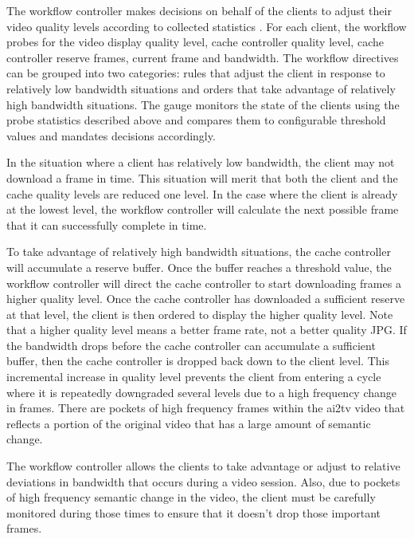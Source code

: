 \documentclass{sig-alternate}
\begin{document}
The workflow controller makes decisions on behalf of the clients to
adjust their video quality levels according to collected statistics .
For each client, the workflow probes for the video display quality
level, cache controller quality level, cache controller reserve
frames, current frame and bandwidth.  The workflow directives can be
grouped into two categories: rules that adjust the client in response
to relatively low bandwidth situations and orders that take advantage
of relatively high bandwidth situations.  The gauge monitors the state
of the clients using the probe statistics described above and compares
them to configurable threshold values and mandates decisions
accordingly.

In the situation where a client has relatively low bandwidth, the
client may not download a frame in time.  This situation will merit
that both the client and the cache quality levels are reduced one
level.  In the case where the client is already at the lowest level,
the workflow controller will calculate the next possible frame that it
can successfully complete in time.

To take advantage of relatively high bandwidth situations, the cache
controller will accumulate a reserve buffer.  Once the buffer reaches
a threshold value, the workflow controller will direct the cache
controller to start downloading frames a higher quality level.  Once
the cache controller has downloaded a sufficient reserve at that
level, the client is then ordered to display the higher quality level.
Note that a higher quality level means a better frame rate, not a
better quality JPG.  If the bandwidth drops before the cache
controller can accumulate a sufficient buffer, then the cache
controller is dropped back down to the client level.  This incremental
increase in quality level prevents the client from entering a cycle
where it is repeatedly downgraded several levels due to a high
frequency change in frames.  There are pockets of high frequency
frames within the ai2tv video that reflects a portion of the original
video that has a large amount of semantic change.

The workflow controller allows the clients to take advantage or adjust
to relative deviations in bandwidth that occurs during a video
session.  Also, due to pockets of high frequency semantic change in
the video, the client must be carefully monitored during those times
to ensure that it doesn't drop those important frames.
\end{document}
